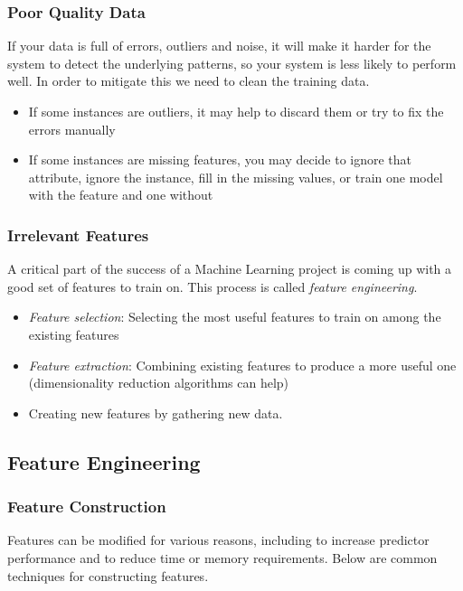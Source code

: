 \documentclass[12pt]{article}
\begin{document}
        \subsubsection{Poor Quality Data}
        If your data is full of errors, outliers and noise, it will make it harder for the system to detect the underlying patterns, so your system is less likely
        to perform well. In order to mitigate this we need to clean the training data.
        \begin{itemize}
            \item If some instances are outliers, it may help to discard them or try to fix the errors manually
            \item If some instances are missing features, you may decide to ignore that attribute, ignore the instance, fill in the missing values, or train one model with the feature and one without
        \end{itemize}

        \subsubsection{Irrelevant Features}
        A critical part of the success of a Machine Learning project is coming up with a good set of features to train on. This process is called \textit{feature engineering}.
        \begin{itemize}
            \item \textit{Feature selection}: Selecting the most useful features to train on among the existing features
            \item \textit{Feature extraction}: Combining existing features to produce a more useful one (dimensionality reduction algorithms can help)
            \item Creating new features by gathering new data.
        \end{itemize}

    \subsection{Feature Engineering}
        \subsubsection{Feature Construction}
            Features can be modified for various reasons, including to increase predictor performance and to reduce time or memory requirements.
            Below are common techniques for constructing features.
\end{document}
